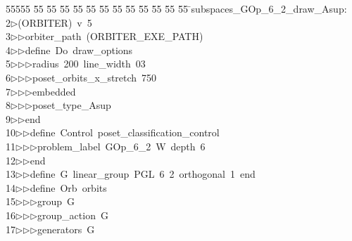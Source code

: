 %
%
\begin{tabbing}
55555 \= 55 \= 55 \= 55 \= 55 \= 55 \= 55 \= 55 \= 55 \= 55 \= 55 \= 55 \= 55 \= \>subspaces\_GOp\_6\_2\_draw\_Asup:\\[0pt]
2\>$\triangleright$\>(ORBITER)\ v\ 5\ \\[0pt]
3\>$\triangleright$\>$\triangleright$\>orbiter\_path\ (ORBITER\_EXE\_PATH)\ \\[0pt]
4\>$\triangleright$\>$\triangleright$\>define\ Do\ draw\_options\ \\[0pt]
5\>$\triangleright$\>$\triangleright$\>$\triangleright$\>radius\ 200\ line\_width\ 03\ \\[0pt]
6\>$\triangleright$\>$\triangleright$\>$\triangleright$\>poset\_orbits\_x\_stretch\ 750\ \\[0pt]
7\>$\triangleright$\>$\triangleright$\>$\triangleright$\>embedded\ \\[0pt]
8\>$\triangleright$\>$\triangleright$\>$\triangleright$\>poset\_type\_Asup\ \\[0pt]
9\>$\triangleright$\>$\triangleright$\>end\ \\[0pt]
10\>$\triangleright$\>$\triangleright$\>define\ Control\ poset\_classification\_control\ \\[0pt]
11\>$\triangleright$\>$\triangleright$\>$\triangleright$\>problem\_label\ GOp\_6\_2\ W\ depth\ 6\ \\[0pt]
12\>$\triangleright$\>$\triangleright$\>end\ \\[0pt]
13\>$\triangleright$\>$\triangleright$\>define\ G\ linear\_group\ PGL\ 6\ 2\ orthogonal\ 1\ end\ \\[0pt]
14\>$\triangleright$\>$\triangleright$\>define\ Orb\ orbits\ \\[0pt]
15\>$\triangleright$\>$\triangleright$\>$\triangleright$\>group\ G\ \\[0pt]
16\>$\triangleright$\>$\triangleright$\>$\triangleright$\>group\_action\ G\ \\[0pt]
17\>$\triangleright$\>$\triangleright$\>$\triangleright$\>generators\ G\ \\[0pt]

\end{tabbing}
